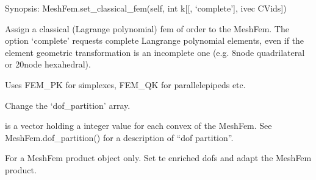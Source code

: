 \documentclass[a4paper,11pt,english]{sphinxmanual}
\begin{document}
\begin{fulllineitems}
\begin{fulllineitems}
\end{fulllineitems}


\begin{fulllineitems}
\label{\detokenize{python/cmdref_MeshFem:getfem.MeshFem.set_classical_fem}}
Synopsis: MeshFem.set\_classical\_fem(self, int k{[}{[}, ‘complete’{]}, ivec CVids{]})

Assign a classical (Lagrange polynomial) fem of order  to the MeshFem.
The option ‘complete’ requests complete Langrange polynomial elements,
even if the element geometric transformation is an incomplete one
(e.g. 8\sphinxhyphen{}node quadrilateral or 20\sphinxhyphen{}node hexahedral).

Uses FEM\_PK for simplexes, FEM\_QK for parallelepipeds etc.

\end{fulllineitems}


\begin{fulllineitems}
\label{\detokenize{python/cmdref_MeshFem:getfem.MeshFem.set_dof_partition}}
Change the ‘dof\_partition’ array.

 is a vector holding a integer value for each convex of the MeshFem.
See MeshFem.dof\_partition() for a description of “dof partition”.

\end{fulllineitems}


\begin{fulllineitems}
\label{\detokenize{python/cmdref_MeshFem:getfem.MeshFem.set_enriched_dofs}}
For a MeshFem product object only. Set te enriched dofs and adapt the MeshFem product.

\end{fulllineitems}


\end{fulllineitems}
\end{document}
